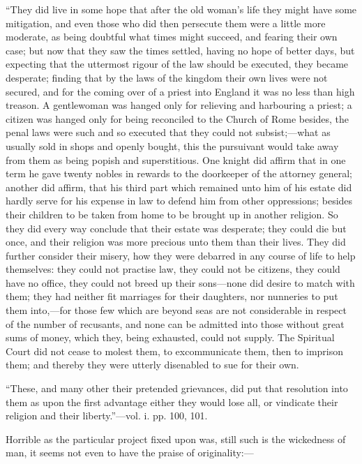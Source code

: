 ``They did live in some hope that
after the old woman's life they might have some mitigation, and even
those who did then persecute them were a little more moderate, as being
doubtful what times might succeed, and fearing their own case; but now
that they saw the times settled, having no hope of better days, but
expecting that the uttermost rigour of the law should be executed, they
became desperate; finding that by the laws of the kingdom their own
lives were not secured, and for the coming over of a priest into England
it was no less than high treason. A gentlewoman was hanged only for
relieving and harbouring a priest; a citizen was hanged only for being
reconciled to the Church of Rome besides, the
penal laws were such and so executed that they could not subsist;—what
as usually sold in shops and openly bought, this the pursuivant would
take away from them as being popish and superstitious. One knight did
affirm that in one term he gave twenty nobles in rewards to the
doorkeeper of the attorney general; another did affirm, that his third
part which remained unto him of his estate did hardly serve for his
expense in law to defend him from other oppressions; besides their
children to be taken from home to be brought up in another religion. So
they did every way conclude that their estate was desperate; they could
die but once, and their religion was more precious unto them than their
lives. They did further consider their misery, how they were debarred in
any course of life to help themselves: they could not practise law, they
could not be citizens, they could have no office, they could not breed
up their sons—none did desire to match with them; they had neither fit
marriages for their daughters, nor nunneries to put them into,—for
those few which are beyond seas are not considerable in respect of the
number of recusants, and none can be admitted into those without great
sums of money, which they, being exhausted, could not supply. The
Spiritual Court did not cease to molest them, to excommunicate them,
then to imprison them; and thereby they were utterly disenabled to sue
for their own.

``These, and many other their
pretended grievances, did put that resolution into them as upon the
first advantage either they would lose all, or vindicate their religion
and their liberty.''—vol. i. pp. 100, 101.

Horrible as the particular project fixed upon was,
still such is the wickedness of man, it seems not even to have the
praise of originality:—

